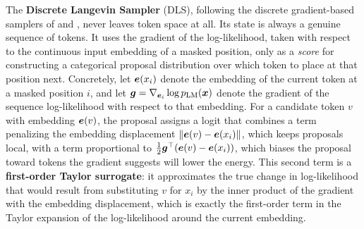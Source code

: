 The \textbf{Discrete Langevin Sampler} (DLS), following the discrete gradient-based samplers of \citet{grathwohl2021oops} and \citet{zhang2022langevin}, never leaves token space at all. Its state is always a genuine sequence of tokens. It uses the gradient of the log-likelihood, taken with respect to the continuous input embedding of a masked position, only as a \emph{score} for constructing a categorical proposal distribution over which token to place at that position next. Concretely, let $\bm{e}(x_i)$ denote the embedding of the current token at a masked position $i$, and let $\bm{g} = \nabla_{\bm{e}_i}\log p_{\text{LM}}(\bm{x})$ denote the gradient of the sequence log-likelihood with respect to that embedding. For a candidate token $v$ with embedding $\bm{e}(v)$, the proposal assigns a logit that combines a term penalizing the embedding displacement $\left\lVert\bm{e}(v) - \bm{e}(x_i)\right\rVert$, which keeps proposals local, with a term proportional to $\tfrac{1}{2}\bm{g}^\top(\bm{e}(v) - \bm{e}(x_i))$, which biases the proposal toward tokens the gradient suggests will lower the energy. This second term is a \textbf{first-order Taylor surrogate}: it approximates the true change in log-likelihood that would result from substituting $v$ for $x_i$ by the inner product of the gradient with the embedding displacement, which is exactly the first-order term in the Taylor expansion of the log-likelihood around the current embedding.

